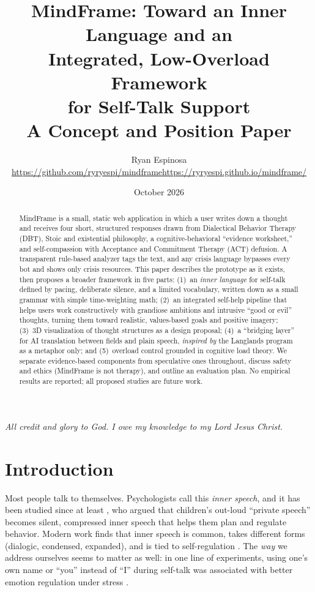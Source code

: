\documentclass[11pt]{article}
\title{\textbf{MindFrame: Toward an Inner Language and an\\ Integrated, Low-Overload Framework\\ for Self-Talk Support}\\[4pt]
\large A Concept and Position Paper}
\author{Ryan Espinosa\\[2pt]
\small\url{https://github.com/ryryespi/mindframe}\quad\textbullet\quad\url{https://ryryespi.github.io/mindframe/}}
\date{October 2026}
\begin{document}
\maketitle

\begin{center}
\emph{All credit and glory to God. I owe my knowledge to my Lord Jesus Christ.}
\end{center}
\vspace{4pt}

\begin{abstract}
\noindent MindFrame is a small, static web application in which a user writes down a thought and receives four short, structured responses drawn from Dialectical Behavior Therapy (DBT), Stoic and existential philosophy, a cognitive-behavioral ``evidence worksheet,'' and self-compassion with Acceptance and Commitment Therapy (ACT) defusion. A transparent rule-based analyzer tags the text, and any crisis language bypasses every bot and shows only crisis resources. This paper describes the prototype as it exists, then proposes a broader framework in five parts: (1)~an \emph{inner language} for self-talk defined by pacing, deliberate silence, and a limited vocabulary, written down as a small grammar with simple time-weighting math; (2)~an integrated self-help pipeline that helps users work constructively with grandiose ambitions and intrusive ``good or evil'' thoughts, turning them toward realistic, values-based goals and positive imagery; (3)~3D visualization of thought structures as a design proposal; (4)~a ``bridging layer'' for AI translation between fields and plain speech, \emph{inspired by} the Langlands program as a metaphor only; and (5)~overload control grounded in cognitive load theory. We separate evidence-based components from speculative ones throughout, discuss safety and ethics (MindFrame is not therapy), and outline an evaluation plan. No empirical results are reported; all proposed studies are future work.
\end{abstract}

\section{Introduction}
Most people talk to themselves. Psychologists call this \emph{inner speech}, and it has been studied since at least \citet{vygotsky1986}, who argued that children's out-loud ``private speech'' becomes silent, compressed inner speech that helps them plan and regulate behavior. Modern work finds that inner speech is common, takes different forms (dialogic, condensed, expanded), and is tied to self-regulation \citep{aldersonday2015,fernyhough2016}. The \emph{way} we address ourselves seems to matter as well: in one line of experiments, using one's own name or ``you'' instead of ``I'' during self-talk was associated with better emotion regulation under stress \citep{kross2014}.
\end{document}
